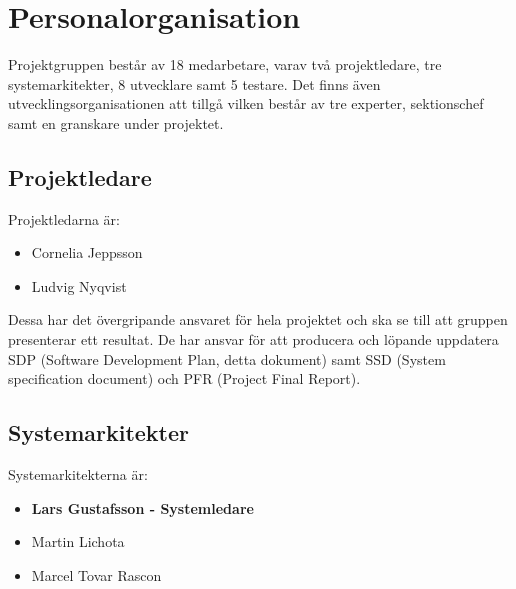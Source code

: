 \documentclass[a4paper]{article}
\begin{document}
\section{Personalorganisation}
\begin{comment}En beskrivning av personalorganisationen som anger hur mycket personal som behövs, när de behövs, och var de behövs. Ansvarsförhållande och ansvarsområde för respektive person skall också anges.

Det ska vara tydligt vilka ansvarsområden som finns samt vem som har ansvar för vad.

Beskriv t.ex. vem som är projektledare, vem som är med i systemgruppen, vem som är med i testgruppen, vem som är med i de olika testgrupperna osv. Beskriv även vilka externa intressenter det finns till projektet.\end{comment}

Projektgruppen består av 18 medarbetare, varav två projektledare, tre systemarkitekter, 8 utvecklare samt 5 testare. Det finns även utvecklingsorganisationen att tillgå vilken består av tre experter, sektionschef samt en granskare under projektet.

\subsection{Projektledare}
Projektledarna är:
\begin{itemize}
\item{Cornelia Jeppsson}
\item{Ludvig Nyqvist}
\end{itemize}

Dessa har det övergripande ansvaret för hela projektet och ska se till att gruppen presenterar ett resultat. De har ansvar för att producera och löpande uppdatera SDP (Software Development Plan, detta dokument) samt SSD (System specification document) och PFR (Project Final Report).

\subsection{Systemarkitekter}
Systemarkitekterna är:
\begin{itemize}
\item{{\bf Lars Gustafsson - Systemledare}}
\item{Martin Lichota}
\item{Marcel Tovar Rascon}
\end{itemize}
\end{document}
